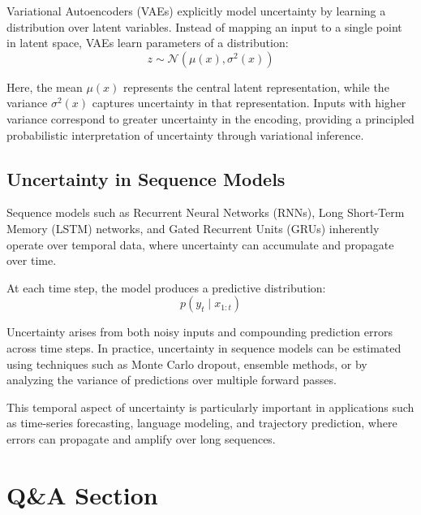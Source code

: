 \documentclass{article}
\begin{document}
Variational Autoencoders (VAEs) explicitly model uncertainty by learning a distribution over latent variables. Instead of mapping an input to a single point in latent space, VAEs learn parameters of a distribution:
\[
z \sim \mathcal{N}(\mu(x), \sigma^2(x))
\]

Here, the mean $\mu(x)$ represents the central latent representation, while the variance $\sigma^2(x)$ captures uncertainty in that representation. Inputs with higher variance correspond to greater uncertainty in the encoding, providing a principled probabilistic interpretation of uncertainty through variational inference.

\subsection{Uncertainty in Sequence Models}

Sequence models such as Recurrent Neural Networks (RNNs), Long Short-Term Memory (LSTM) networks, and Gated Recurrent Units (GRUs) inherently operate over temporal data, where uncertainty can accumulate and propagate over time.

At each time step, the model produces a predictive distribution:
\[
p(y_t \mid x_{1:t})
\]

Uncertainty arises from both noisy inputs and compounding prediction errors across time steps. In practice, uncertainty in sequence models can be estimated using techniques such as Monte Carlo dropout, ensemble methods, or by analyzing the variance of predictions over multiple forward passes.

This temporal aspect of uncertainty is particularly important in applications such as time-series forecasting, language modeling, and trajectory prediction, where errors can propagate and amplify over long sequences.

\section{Q\&A Section}
\end{document}
